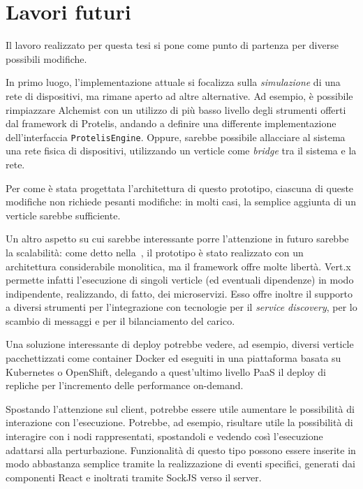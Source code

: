 \chapter{Lavori futuri}\label{ch:future}

  Il lavoro realizzato per questa tesi si pone come punto di partenza per diverse possibili modifiche.

  In primo luogo, l'implementazione attuale si focalizza sulla \emph{simulazione} di una rete di dispositivi, ma rimane aperto ad altre alternative.
  Ad esempio, è possibile rimpiazzare Alchemist con un utilizzo di più basso livello degli strumenti offerti dal framework di Protelis, andando a definire una differente implementazione dell'interfaccia \texttt{ProtelisEngine}.
  Oppure, sarebbe possibile allacciare al sistema una rete fisica di dispositivi, utilizzando un verticle come \emph{bridge} tra il sistema e la rete.

  Per come è stata progettata l'architettura di questo prototipo, ciascuna di queste modifiche non richiede pesanti modifiche:
  in molti casi, la semplice aggiunta di un verticle sarebbe sufficiente.

  Un altro aspetto su cui sarebbe interessante porre l'attenzione in futuro sarebbe la scalabilità:
  come detto nella~, il prototipo è stato realizzato con un architettura considerabile monolitica, ma il framework offre molte libertà.
  Vert.x permette infatti l'esecuzione di singoli verticle (ed eventuali dipendenze) in modo indipendente, realizzando, di fatto, dei microservizi.
  Esso offre inoltre il supporto a diversi strumenti per l'integrazione con tecnologie per il \emph{service discovery}, per lo scambio di messaggi e per il bilanciamento del carico.

  Una soluzione interessante di deploy potrebbe vedere, ad esempio, diversi verticle pacchettizzati come container Docker ed eseguiti in una piattaforma basata su Kubernetes o OpenShift,
  delegando a quest'ultimo livello PaaS il deploy di repliche per l'incremento delle performance on-demand.

  Spostando l'attenzione sul client, potrebbe essere utile aumentare le possibilità di interazione con l'esecuzione.
  Potrebbe, ad esempio, risultare utile la possibilità di interagire con i nodi rappresentati, spostandoli e vedendo così l'esecuzione adattarsi alla perturbazione.
  Funzionalità di questo tipo possono essere inserite in modo abbastanza semplice tramite la realizzazione di eventi specifici, generati dai componenti React e inoltrati tramite SockJS verso il server.

